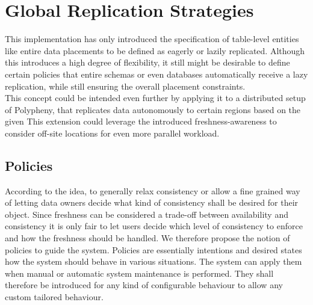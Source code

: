 


\tocless\section{Global Replication Strategies}
This implementation has only introduced the specification of table-level entities like entire data placements to be defined as eagerly or lazily replicated.
Although this introduces a high degree of flexibility, it still might be desirable to define certain policies that entire schemas or even databases automatically 
receive a lazy replication, while still ensuring the overall placement constraints.\\
This concept could be intended even further by applying it to a distributed setup of Polypheny, that replicates data autonomously to certain regions based on the given 
This extension could leverage the introduced freshness-awareness to consider off-site locations for even more parallel workload.



\subsection{Policies}
\label{sec:polcies}

According to the idea, to generally relax consistency or allow a fine grained way of letting data owners decide what kind of consistency shall be desired for their object. 
Since freshness can be considered a trade-off between availability and consistency it is only fair to let users decide which level of consistency to enforce and 
how the freshness should be handled. We therefore propose the notion of policies to guide the system.
Policies are essentially intentions and desired states how the system should behave in various situations. 
The system can apply them when manual or automatic system maintenance is performed.
They shall therefore be introduced for any kind of configurable behaviour to allow any custom tailored behaviour. \\

